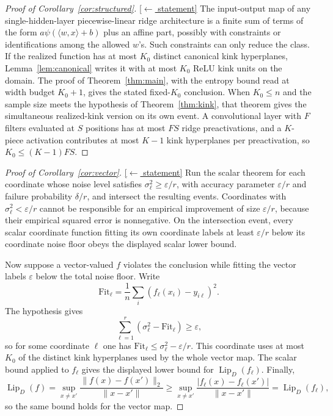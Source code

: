 \documentclass[11pt,reqno]{amsart}
\theoremstyle{plain}
\theoremstyle{definition}
\theoremstyle{remark}
\newcommand{\eps}{\varepsilon}
\newcommand{\Lip}{\operatorname{Lip}}
\newcommand{\stmtbutton}[1]{\hyperref[#1]{\textnormal{\footnotesize\textsf{[$\leftarrow$ statement]}}}}
\begin{document}
\begin{proof}[Proof of Corollary~\textup{\ref{cor:structured}}]\label{proof:structured}\stmtbutton{cor:structured}
The input-output map of any single-hidden-layer piecewise-linear ridge architecture is a finite sum of terms of the form $a\psi(\langle w,x\rangle+b)$ plus an affine part, possibly with constraints or identifications among the allowed $w$'s. Such constraints can only reduce the class. If the realized function has at most $K_0$ distinct canonical kink hyperplanes, Lemma~\ref{lem:canonical} writes it with at most $K_0$ ReLU kink units on the domain. The proof of Theorem~\ref{thm:main}, with the entropy bound read at width budget $K_0+1$, gives the stated fixed-$K_0$ conclusion. When $K_0\le n$ and the sample size meets the hypothesis of Theorem~\ref{thm:kink}, that theorem gives the simultaneous realized-kink version on its own event. A convolutional layer with $F$ filters evaluated at $S$ positions has at most $FS$ ridge preactivations, and a $K$-piece activation contributes at most $K-1$ kink hyperplanes per preactivation, so $K_0\le(K-1)FS$.
\end{proof}

\begin{proof}[Proof of Corollary~\textup{\ref{cor:vector}}]\label{proof:vector}\stmtbutton{cor:vector}
Run the scalar theorem for each coordinate whose noise level satisfies $\sigma_\ell^2\ge\eps/r$, with accuracy parameter $\eps/r$ and failure probability $\delta/r$, and intersect the resulting events. Coordinates with $\sigma_\ell^2<\eps/r$ cannot be responsible for an empirical improvement of size $\eps/r$, because their empirical squared error is nonnegative. On the intersection event, every scalar coordinate function fitting its own coordinate labels at least $\eps/r$ below its coordinate noise floor obeys the displayed scalar lower bound.

Now suppose a vector-valued $f$ violates the conclusion while fitting the vector labels $\eps$ below the total noise floor. Write
\[
        \mathrm{Fit}_\ell=\frac1n\sum_i(f_\ell(x_i)-y_{i\ell})^2.
\]
The hypothesis gives
\[
        \sum_{\ell=1}^r(\sigma_\ell^2-\mathrm{Fit}_\ell)\ge\eps,
\]
so for some coordinate $\ell$ one has $\mathrm{Fit}_\ell\le\sigma_\ell^2-\eps/r$. This coordinate uses at most $K_0$ of the distinct kink hyperplanes used by the whole vector map. The scalar bound applied to $f_\ell$ gives the displayed lower bound for $\Lip_D(f_\ell)$. Finally,
\[
        \Lip_D(f)=\sup_{x\ne x'}\frac{\|f(x)-f(x')\|_2}{\|x-x'\|}\ge
        \sup_{x\ne x'}\frac{|f_\ell(x)-f_\ell(x')|}{\|x-x'\|}=\Lip_D(f_\ell),
\]
so the same bound holds for the vector map.
\end{proof}
\end{document}
